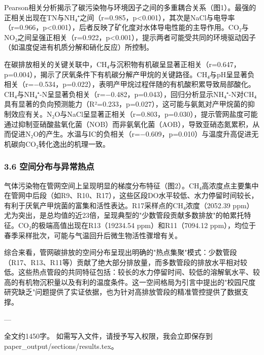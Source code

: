 Pearson相关分析揭示了碳污染物与环境因子之间的多重耦合关系（图1）。最强的正相关出现在TN与NH₄⁺之间（r=0.985，p<0.001），其次是NaCl与电导率（r=0.966，p<0.001），后者反映了矿化度对水体导电性能的主导作用。CO₂与NO₂之间呈强正相关（r=0.922，p<0.001），提示两者可能受共同的环境驱动因子（如温度促进有机质分解和硝化反应）所控制。

在碳排放相关的关键关联中，CH₄与沉积物有机碳呈显著正相关（r=0.647，p=0.004），揭示了厌氧条件下有机碳分解产甲烷的关键路径。CH₄与pH呈显著负相关（r=−0.534，p=0.022），表明产甲烷过程伴随的有机酸积累导致局部酸化。CH₄与NH₄⁺-N呈显著负相关（r=−0.482，p=0.043），回归分析显示NH₄⁺-N对CH₄具有显著的负向预测能力（R²=0.233，p=0.027），这可能与氨氮对产甲烷菌的抑制效应有关。N₂O与NaCl呈显著正相关（r=0.803，p=0.030），提示管网盐度可能通过抑制亚硝酸盐氧化菌（NOB）而非氨氧化菌（AOB），导致亚硝态氮累积，从而促进N₂O的产生。水温与IC的负相关（r=−0.609，p=0.010）与温度升高促进无机碳向CO₂转化逸出的机理一致。

\subsubsection{3.6 空间分布与异常热点}

气体污染物在管网空间上呈现明显的梯度分布特征（图2）。CH₄高浓度点主要集中在管网中后段（如R9、R10、R17），这些区段DO水平较低、水力停留时间较长，有利于厌氧产甲烷菌的富集和活性表达。R17采样点的CH₄浓度（2052.39 ppm）尤为突出，是总均值的近23倍，呈现典型的"少数管段贡献多数排放"的帕累托特征。CO₂的极端高值出现在R13（19234.54 ppm）和R11（7094.12 ppm），均位于春季采样批次，可能与气温回升后微生物活性骤增有关。

综合来看，管网碳排放的空间分布呈现出明确的"热点集聚"模式：少数管段（R17、R13、R11等）贡献了绝大部分排放量，而多数管段的排放水平相对较低。这些热点管段的共同特征包括：较长的水力停留时间、较低的溶解氧水平、较高的有机物沉积量以及有利的温度条件。这一空间格局为引言中提出的"校园尺度研究缺乏"问题提供了实证依据，也为针对高排放管段的精准管控提供了数据支撑。

---

全文约1450字。 如需写入文件，请授予写入权限，我会立即保存到 paper\_output/sections/results.tex。